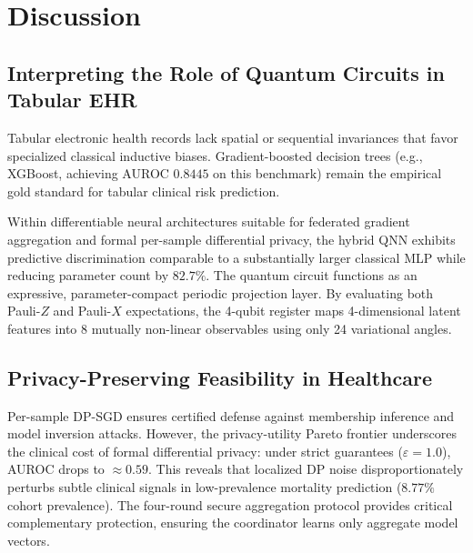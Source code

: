 \documentclass[conference]{IEEEtran}
\begin{document}
\section{Discussion}
\subsection{Interpreting the Role of Quantum Circuits in Tabular EHR}
Tabular electronic health records lack spatial or sequential invariances that favor specialized classical inductive biases. Gradient-boosted decision trees (e.g., XGBoost, achieving AUROC $0.8445$ on this benchmark) remain the empirical gold standard for tabular clinical risk prediction.

Within differentiable neural architectures suitable for federated gradient aggregation and formal per-sample differential privacy, the hybrid QNN exhibits predictive discrimination comparable to a substantially larger classical MLP while reducing parameter count by $82.7\%$. The quantum circuit functions as an expressive, parameter-compact periodic projection layer. By evaluating both Pauli-$Z$ and Pauli-$X$ expectations, the 4-qubit register maps 4-dimensional latent features into 8 mutually non-linear observables using only 24 variational angles.

\subsection{Privacy-Preserving Feasibility in Healthcare}
Per-sample DP-SGD ensures certified defense against membership inference and model inversion attacks. However, the privacy-utility Pareto frontier underscores the clinical cost of formal differential privacy: under strict guarantees ($\varepsilon = 1.0$), AUROC drops to $\approx 0.59$. This reveals that localized DP noise disproportionately perturbs subtle clinical signals in low-prevalence mortality prediction ($8.77\%$ cohort prevalence). The four-round secure aggregation protocol provides critical complementary protection, ensuring the coordinator learns only aggregate model vectors.
\end{document}
